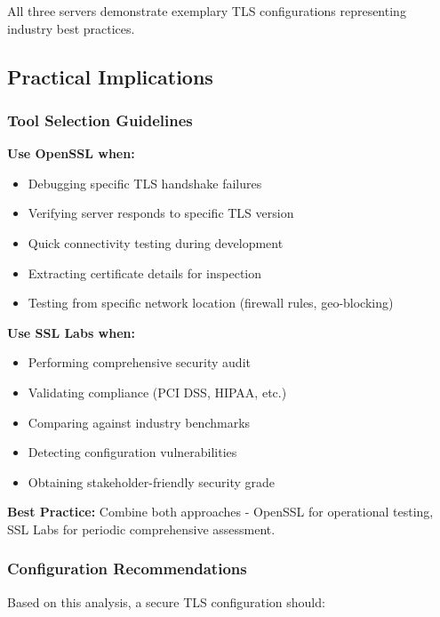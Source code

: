 \documentclass[12pt,a4paper]{article}
\begin{document}
All three servers demonstrate exemplary TLS configurations representing industry best practices.

\subsection{Practical Implications}

\subsubsection{Tool Selection Guidelines}

\textbf{Use OpenSSL when:}
\begin{itemize}
    \item Debugging specific TLS handshake failures
    \item Verifying server responds to specific TLS version
    \item Quick connectivity testing during development
    \item Extracting certificate details for inspection
    \item Testing from specific network location (firewall rules, geo-blocking)
\end{itemize}

\textbf{Use SSL Labs when:}
\begin{itemize}
    \item Performing comprehensive security audit
    \item Validating compliance (PCI DSS, HIPAA, etc.)
    \item Comparing against industry benchmarks
    \item Detecting configuration vulnerabilities
    \item Obtaining stakeholder-friendly security grade
\end{itemize}

\textbf{Best Practice:} Combine both approaches - OpenSSL for operational testing, SSL Labs for periodic comprehensive assessment.

\subsubsection{Configuration Recommendations}

Based on this analysis, a secure TLS configuration should:
\end{document}
